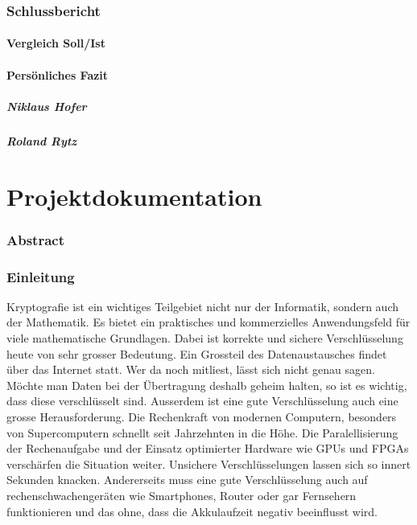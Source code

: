 \documentclass[11pt,paper=a4,final]{scrartcl}
\begin{document}
\section{Schlussbericht}
\subsection{Vergleich Soll/Ist}
\subsection{Pers\"onliches Fazit}
\subsubsection{Niklaus Hofer}
\subsubsection{Roland Rytz}
\part{Projektdokumentation}
\section{Abstract}
\section{Einleitung}
Kryptografie ist ein wichtiges Teilgebiet nicht nur der Informatik, sondern auch der Mathematik. Es bietet ein praktisches und kommerzielles Anwendungsfeld f\"ur viele mathematische Grundlagen. Dabei ist korrekte und sichere Verschl\"usselung heute von sehr grosser Bedeutung. Ein Grossteil des Datenaustausches findet \"uber das Internet statt. Wer da noch mitliest, l\"asst sich nicht genau sagen. M\"ochte man Daten bei der \"Ubertragung deshalb geheim halten, so ist es wichtig, dass diese verschl\"usselt sind. Ausserdem ist eine gute Verschl\"usselung auch eine grosse Herausforderung. Die Rechenkraft von modernen Computern, besonders von Supercomputern schnellt seit Jahrzehnten in die H\"ohe. Die Paralellisierung der Rechenaufgabe und der Einsatz optimierter Hardware wie GPUs und FPGAs versch\"arfen die Situation weiter. Unsichere Verschl\"usselungen lassen sich so innert Sekunden knacken. Andererseits muss eine gute Verschl\"usselung auch auf rechenschwachenger\"aten wie Smartphones, Router oder gar Fernsehern funktionieren und das ohne, dass die Akkulaufzeit negativ beeinflusst wird.
\end{document}
